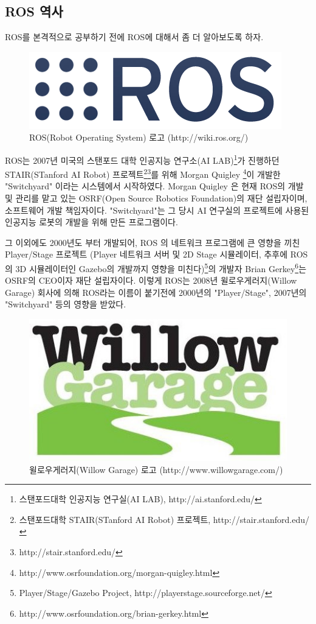 \subsection{ROS 역사}

ROS를 본격적으로 공부하기 전에 ROS에 대해서 좀 더 알아보도록 하자. 

\begin{figure}[h]
\centering\includegraphics[width=0.5\columnwidth]{pictures/chapter1/roslogo.png}
\caption{ROS(Robot Operating System) 로고 (http://wiki.ros.org/)}
\end{figure}

ROS는 2007년 미국의 스탠포드 대학 인공지능 연구소(AI LAB)\footnote{스탠포드대학 인공지능 연구실(AI LAB), http://ai.stanford.edu/}가 진행하던 STAIR(STanford AI Robot) 프로젝트\footnote{스탠포드대학 STAIR(STanford AI Robot) 프로젝트, http://stair.stanford.edu/}\footnote{http://stair.stanford.edu/}를 위해 Morgan Quigley \footnote{http://www.osrfoundation.org/morgan-quigley.html}이 개발한 "Switchyard" 이라는 시스템에서 시작하였다. Morgan Quigley 은 현재 ROS의 개발 및 관리를 맡고 있는 OSRF(Open Source Robotics Foundation)의 재단 설립자이며, 소프트웨어 개발 책임자이다. "Switchyard"는 그 당시 AI 연구실의 프로젝트에 사용된 인공지능 로봇의 개발을 위해 만든 프로그램이다. 

그 이외에도 2000년도 부터 개발되어, ROS 의 네트워크 프로그램에 큰 영향을 끼친 Player/Stage 프로젝트 (Player 네트워크 서버 및 2D Stage 시뮬레이터, 추후에 ROS의 3D 시뮬레이터인 Gazebo의 개발까지 영향을 미친다)\footnote{Player/Stage/Gazebo Project, http://playerstage.sourceforge.net/}의 개발자 Brian Gerkey\footnote{http://www.osrfoundation.org/brian-gerkey.html}는 OSRF의 CEO이자 재단 설립자이다. 이렇게 ROS는 2008년 윌로우게러지(Willow Garage) 회사에 의해 ROS라는 이름이 붙기전에 2000년의 "Player/Stage", 2007년의 "Switchyard" 등의 영향을 받았다.

\begin{figure}[h]
\centering\includegraphics[width=0.5\columnwidth]{pictures/chapter1/willow_garage_logo.jpg}
\caption{윌로우게러지(Willow Garage) 로고 (http://www.willowgarage.com/)}
\end{figure}

